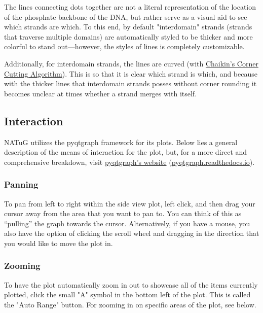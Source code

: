 \documentclass[titlepage]{article}
\begin{document}
	The lines connecting dots together are not a literal representation of the location of the phosphate backbone of the DNA, but rather serve as a visual aid to see which strands are which. To this end, by default "interdomain" strands (strands that traverse multiple domains) are automatically styled to be thicker and more colorful to stand out—however, the styles of lines is completely customizable.
	
	Additionally, for interdomain strands, the lines are curved (with \href{https://www.cs.unc.edu/~dm/UNC/COMP258/LECTURES/Chaikins-Algorithm.pdf}{Chaikin's Corner Cutting Algorithm}). This is so that it is clear which strand is which, and because with the thicker lines that interdomain strands posses without corner rounding it becomes unclear at times whether a strand merges with itself. 
	
	\subsection{Interaction} \label{sect:plot-interaction}
	NATuG utilizes the pyqtgraph framework for its plots. Below lies a general description of the means of interaction for the plot, but, for a more direct and comprehensive breakdown, visit \href{https://pyqtgraph.readthedocs.io/en/latest/user_guide/mouse_interaction.html}{pyqtgraph’s website} (\href{https://pyqtgraph.readthedocs.io/en/latest/user_guide/mouse_interaction.html}{pyqtgraph.readthedocs.io}).
	
	\subsubsection{Panning}
	To pan from left to right within the side view plot, left click, and then drag your cursor away from the area that you want to pan to. You can think of this as “pulling” the graph towards the cursor. Alternatively, if you have a mouse, you also have the option of clicking the scroll wheel and dragging in the direction that you would like to move the plot in.
	
	\subsubsection{Zooming}
	
	To have the plot automatically zoom in out to showcase all of the items currently plotted, click the small "A" symbol in the bottom left of the plot. This is called the "Auto Range" button. For zooming in on specific areas of the plot, see below.
	
\end{document}
